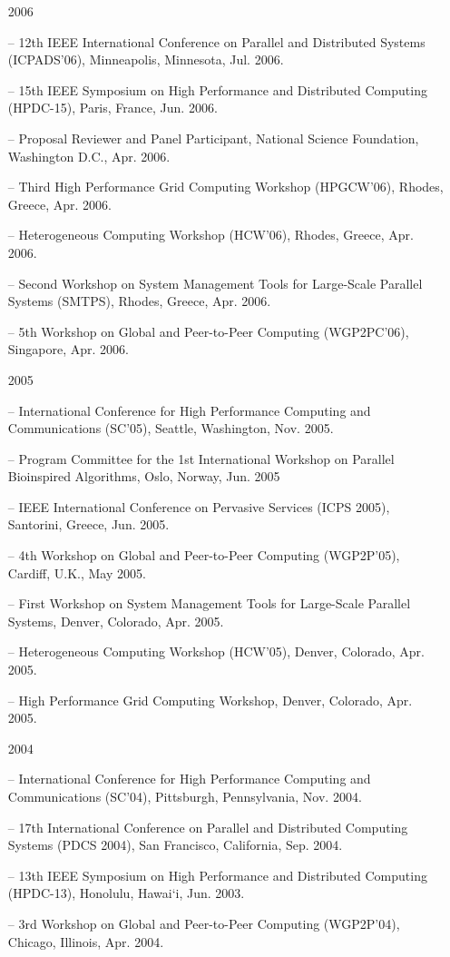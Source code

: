 \documentclass[times,11pt]{letter}
\begin{document}
\begin{itemize}
\item [2006]
\item[--]  12th IEEE International Conference on Parallel and Distributed Systems (ICPADS'06), Minneapolis, Minnesota, Jul. 2006.
\item[--]  15th IEEE Symposium on High Performance and Distributed Computing (HPDC-15), Paris, France, Jun. 2006.
\item[--] Proposal Reviewer and Panel Participant, National Science Foundation, Washington D.C., Apr. 2006.
\item[--]  Third High Performance Grid Computing Workshop (HPGCW'06), Rhodes, Greece, Apr. 2006.
\item[--]  Heterogeneous Computing Workshop (HCW'06), Rhodes, Greece, Apr. 2006.
\item[--]  Second Workshop on System Management Tools for Large-Scale Parallel Systems (SMTPS), Rhodes, Greece, Apr. 2006.
\item[--]  5th Workshop on Global and Peer-to-Peer Computing (WGP2PC'06), Singapore, Apr. 2006. 

\item [2005]
\item[--]  International Conference for High Performance Computing and Communications (SC'05), Seattle, Washington, Nov. 2005.
\item[--] Program Committee for the 1st International Workshop on Parallel Bioinspired Algorithms, Oslo, Norway, Jun. 2005
\item[--]  IEEE International Conference on Pervasive Services (ICPS 2005), Santorini, Greece, Jun. 2005.
\item[--]  4th Workshop on Global and Peer-to-Peer Computing (WGP2P'05), Cardiff, U.K., May 2005. 
\item[--]  First Workshop on System Management Tools for Large-Scale Parallel Systems, Denver, Colorado, Apr. 2005.
\item[--]  Heterogeneous Computing Workshop (HCW'05), Denver, Colorado, Apr. 2005.
\item[--]  High Performance Grid Computing Workshop, Denver, Colorado, Apr. 2005.

\item [2004]
\item[--]  International Conference for High Performance Computing and Communications (SC'04), Pittsburgh, Pennsylvania, Nov. 2004.
\item[--]  17th International Conference on Parallel and Distributed Computing Systems (PDCS 2004), San Francisco, California, Sep. 2004. 
\item[--]  13th IEEE Symposium on High Performance and Distributed Computing (HPDC-13), Honolulu, Hawai`i, Jun. 2003.
\item[--]  3rd Workshop on Global and Peer-to-Peer Computing (WGP2P'04), Chicago, Illinois, Apr. 2004. 


\end{itemize}
\end{document}
